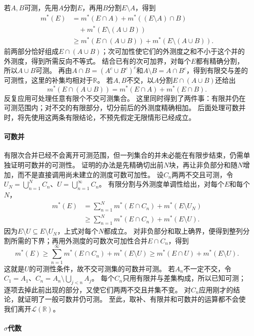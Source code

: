 若$A,B$可测，先用$A$分割$E$，再用$B$分割$E\setminus A$，得到
\[
 \begin{aligned}
 m^*(E)&=m^*(E\cap A)+m^*((E\setminus A)\cap B)\\
 &\quad +m^*(E\setminus(A\cup B))\\
 &\geq m^*(E\cap(A\cup B))+m^*(E\setminus(A\cup B)).
 \end{aligned}
\]
前两部分恰好组成$E\cap(A\cup B)$；次可加性使它们的外测度之和不小于这个并的外测度，得到所需反向不等式。
结合已有的次可加界，对每个$E$都有精确分割，所以$A\cup B$可测。
再由$A\cap B=(A^c\cup B^c)^c$和$A\setminus B=A\cap B^c$，得到有限交与差的可测性，这里的补集均相对于$\mathbb R$。
若$A,B$不交，以$A$分割$E\cap(A\cup B)$还给出
\[
 m^*(E\cap(A\cup B))=m^*(E\cap A)+m^*(E\cap B).
\]
反复应用可处理任意有限个不交可测集合。
这里同时得到了两件事：有限并仍在可测范围内；对不交的有限部分，切分前后的外测度精确相加。
后面处理可数并时，将先使用这两条有限结论，不预先假定无限情形已经成立。

\paragraph{可数并}

有限次合并已经不会离开可测范围，但一列集合的并未必能在有限步结束，仍需单独证明可数并的可测性。
证明的办法是先精确切出前$N$块，再让非负部分和随$N$增加，而不是直接调用尚未建立的测度可数可加性。
设$C_n$两两不交且可测，令$U_N=\bigcup_{n=1}^NC_n$、$U=\bigcup_{n=1}^{\infty}C_n$。
有限分割与外测度单调性给出，对每个$E$和每个$N$，
\[
 \begin{aligned}
 m^*(E)
 &=\sum_{n=1}^Nm^*(E\cap C_n)+m^*(E\setminus U_N)\\
 &\geq\sum_{n=1}^Nm^*(E\cap C_n)+m^*(E\setminus U).
 \end{aligned}
\]
因为$E\setminus U\subseteq E\setminus U_N$，上式对每个$N$都成立。
对非负部分和取上确界，便得到整列分割所需的下界；再用外测度的可数次可加性合并$E\cap C_n$，得到
\[
 m^*(E)\geq\sum_{n=1}^{\infty}m^*(E\cap C_n)+m^*(E\setminus U)
 \geq m^*(E\cap U)+m^*(E\setminus U).
\]
这就是$U$的可测性条件，故不交可测集的可数并可测。
若$A_n$不一定不交，令$C_1=A_1$、$C_n=A_n\setminus\bigcup_{j<n}A_j$。
每个$C_n$只用有限并与差集构成，所以已知可测；逐项去掉此前出现的部分，又使它们两两不交且并集不变。
对$C_n$应用刚才的结论，就证明了一般可数并仍可测。
至此，取补、有限并和可数并的运算都不会使我们离开$\mathcal L(\mathbb R)$。

\paragraph{$\sigma$代数}

